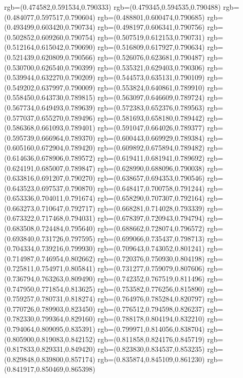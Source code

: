 {{{			rgb=(0.474582,0.591534,0.790333)
			rgb=(0.479345,0.594535,0.790488)
			rgb=(0.484077,0.597517,0.790604)
			rgb=(0.488801,0.600474,0.790685)
			rgb=(0.493499,0.603420,0.790734)
			rgb=(0.498197,0.606341,0.790756)
			rgb=(0.502852,0.609260,0.790754)
			rgb=(0.507519,0.612153,0.790731)
			rgb=(0.512164,0.615042,0.790690)
			rgb=(0.516809,0.617927,0.790634)
			rgb=(0.521439,0.620809,0.790566)
			rgb=(0.526076,0.623681,0.790487)
			rgb=(0.530700,0.626540,0.790399)
			rgb=(0.535321,0.629403,0.790306)
			rgb=(0.539944,0.632270,0.790209)
			rgb=(0.544573,0.635131,0.790109)
			rgb=(0.549202,0.637997,0.790009)
			rgb=(0.553824,0.640861,0.789910)
			rgb=(0.558450,0.643730,0.789815)
			rgb=(0.563097,0.646609,0.789724)
			rgb=(0.567734,0.649493,0.789639)
			rgb=(0.572383,0.652376,0.789563)
			rgb=(0.577037,0.655270,0.789496)
			rgb=(0.581693,0.658180,0.789442)
			rgb=(0.586368,0.661093,0.789401)
			rgb=(0.591047,0.664026,0.789377)
			rgb=(0.595739,0.666964,0.789370)
			rgb=(0.600443,0.669929,0.789384)
			rgb=(0.605160,0.672904,0.789420)
			rgb=(0.609892,0.675894,0.789482)
			rgb=(0.614636,0.678906,0.789572)
			rgb=(0.619411,0.681941,0.789692)
			rgb=(0.624191,0.685007,0.789847)
			rgb=(0.628990,0.688096,0.790038)
			rgb=(0.633816,0.691207,0.790270)
			rgb=(0.638657,0.694353,0.790546)
			rgb=(0.643523,0.697537,0.790870)
			rgb=(0.648417,0.700758,0.791244)
			rgb=(0.653336,0.704011,0.791674)
			rgb=(0.658290,0.707307,0.792164)
			rgb=(0.663273,0.710647,0.792717)
			rgb=(0.668281,0.714028,0.793339)
			rgb=(0.673322,0.717468,0.794031)
			rgb=(0.678397,0.720943,0.794794)
			rgb=(0.683508,0.724484,0.795640)
			rgb=(0.688662,0.728074,0.796572)
			rgb=(0.693840,0.731726,0.797595)
			rgb=(0.699066,0.735437,0.798713)
			rgb=(0.704334,0.739216,0.799930)
			rgb=(0.709643,0.743052,0.801241)
			rgb=(0.714987,0.746954,0.802662)
			rgb=(0.720376,0.750930,0.804198)
			rgb=(0.725811,0.754971,0.805841)
			rgb=(0.731277,0.759079,0.807606)
			rgb=(0.736794,0.763263,0.809490)
			rgb=(0.742352,0.767519,0.811496)
			rgb=(0.747950,0.771854,0.813625)
			rgb=(0.753582,0.776256,0.815890)
			rgb=(0.759257,0.780731,0.818274)
			rgb=(0.764976,0.785284,0.820797)
			rgb=(0.770726,0.789903,0.823450)
			rgb=(0.776512,0.794598,0.826237)
			rgb=(0.782330,0.799364,0.829160)
			rgb=(0.788178,0.804194,0.832210)
			rgb=(0.794064,0.809095,0.835391)
			rgb=(0.799971,0.814056,0.838704)
			rgb=(0.805900,0.819083,0.842152)
			rgb=(0.811858,0.824176,0.845719)
			rgb=(0.817833,0.829331,0.849420)
			rgb=(0.823830,0.834537,0.853235)
			rgb=(0.829848,0.839800,0.857174)
			rgb=(0.835874,0.845109,0.861230)
			rgb=(0.841917,0.850469,0.865398)
}}}
